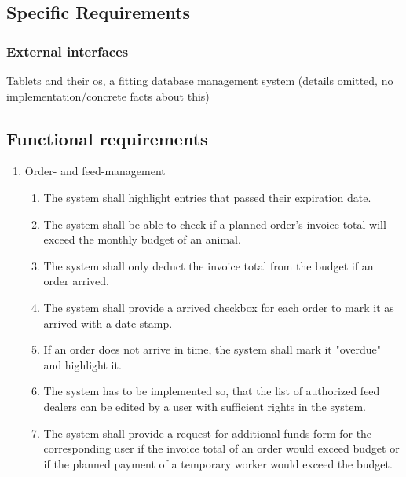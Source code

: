 	\subsection{Specific Requirements}

	\subsubsection{External interfaces}
	Tablets and their os, a fitting database management system (details omitted, no implementation/concrete facts about this)

	\subsection{Functional requirements}

\begin{enumerate}[label*=\arabic*]
\item Order- and feed-management
	\begin{enumerate}[label*=\arabic*]
	\item The system shall highlight entries that passed their expiration date.
	\item The system shall be able to check if a planned order’s invoice total will exceed the monthly budget of an animal.
	\item The system shall only deduct the invoice total from the budget if an order arrived.
	\item The system shall provide a arrived checkbox for each order to mark it as arrived with a date stamp.
	\item If an order does not arrive in time, the system shall mark it "overdue" and highlight it.
	\item The system has to be implemented so, that the list of authorized feed dealers can be edited by a user with sufficient rights in the system.
	\item The system shall provide a request for additional funds form for the corresponding user if the invoice total of an order would exceed budget or if the planned payment of a temporary worker would exceed the budget.
	\end{enumerate}


\end{enumerate}
